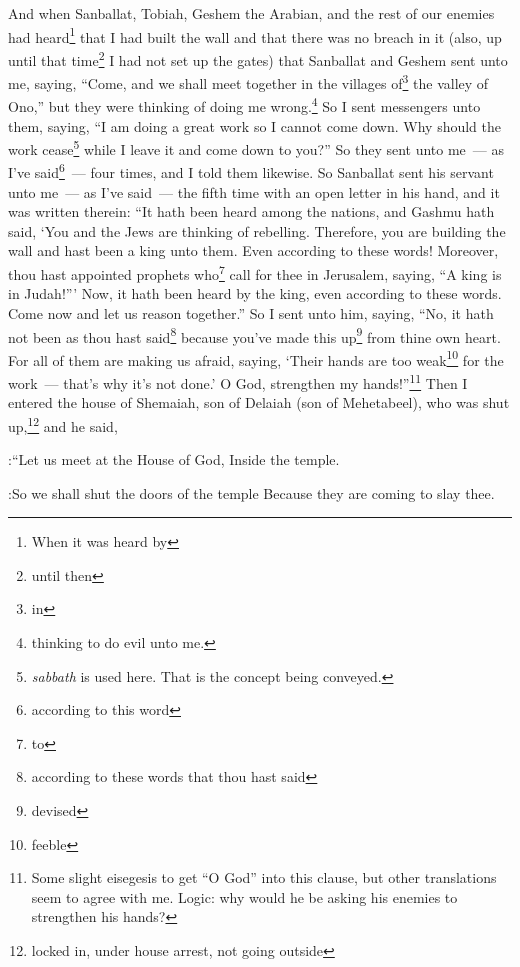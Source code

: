 
\begin{enumerate*}[mode=unboxed]
     And when Sanballat, Tobiah, Geshem the Arabian, and the rest of our enemies had heard\footnote{When it was heard by} that I had built the wall and that there was no breach in it (also, up until that time\footnote{until then} I had not set up the gates)%
     that Sanballat and Geshem sent unto me, saying, ``Come, and we shall meet together in the villages of\footnote{in} the valley of Ono,'' but they were thinking of doing me wrong.\footnote{thinking to do evil unto me.}%
     So I sent messengers unto them, saying, ``I am doing a great work so I cannot come down. Why should the work cease\footnote{\textit{sabbath} is used here. That is the concept being conveyed.} while I leave it and come down to you?''%
     So they sent unto me~--- as I've said\footnote{according to this word}~--- four times, and I told them likewise.%
     So Sanballat sent his servant unto me~--- as I've said~--- the fifth time with an open letter in his hand,%
     and it was written therein: ``It hath been heard among the nations, and Gashmu hath said, `You and the Jews are thinking of rebelling. Therefore, you are building the wall and hast been a king unto them. Even according to these words!%
     Moreover, thou hast appointed prophets who\footnote{to} call for thee in Jerusalem, saying, ``A king is in Judah!''' Now, it hath been heard by the king, even according to these words. Come now and let us reason together.''%
     So I sent unto him, saying, ``No, it hath not been as thou hast said\footnote{according to these words that thou hast said} because you've made this up\footnote{devised} from thine own heart.%
     For all of them are making us afraid, saying, `Their hands are too weak\footnote{feeble} for the work~--- that's why it's not done.' O God, strengthen my hands!''\footnote{Some slight eisegesis to get ``O God'' into this clause, but other translations seem to agree with me. Logic: why would he be asking his enemies to strengthen his hands?}%
     Then I entered the house of Shemaiah, son of Delaiah (son of Mehetabeel), who was shut up,\footnote{locked in, under house arrest, not going outside} and he said,

:``Let us meet at the House of God, Inside the temple.

:So we shall shut the doors of the temple Because they are coming to slay thee.


\end{enumerate*}
